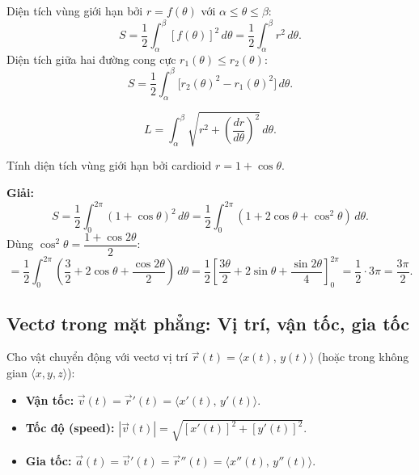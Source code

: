 \documentclass[12pt,a4paper]{article}
\begin{document}
\begin{congthuc}[title={Diện tích miền cực}]
  Diện tích vùng giới hạn bởi $r = f(\theta)$ với $\alpha \le \theta \le \beta$:
  \[
    S = \frac{1}{2}\int_\alpha^\beta [f(\theta)]^2\,d\theta = \frac{1}{2}\int_\alpha^\beta r^2\,d\theta.
  \]
  Diện tích giữa hai đường cong cực $r_1(\theta) \le r_2(\theta)$:
  \[
    S = \frac{1}{2}\int_\alpha^\beta \bigl[r_2(\theta)^2 - r_1(\theta)^2\bigr]\,d\theta.
  \]
\end{congthuc}

\begin{congthuc}[title={Độ dài cung trong tọa độ cực}]
  \[
    L = \int_\alpha^\beta \sqrt{r^2 + \left(\frac{dr}{d\theta}\right)^2}\,d\theta.
  \]
\end{congthuc}

\begin{vidu}
  Tính diện tích vùng giới hạn bởi cardioid $r = 1 + \cos\theta$.

  \medskip\textbf{Giải:}
  \[
    S = \frac{1}{2}\int_0^{2\pi} (1+\cos\theta)^2\,d\theta
    = \frac{1}{2}\int_0^{2\pi} (1 + 2\cos\theta + \cos^2\theta)\,d\theta.
  \]
  Dùng $\cos^2\theta = \dfrac{1+\cos 2\theta}{2}$:
  \[
    = \frac{1}{2}\int_0^{2\pi} \left(\frac{3}{2} + 2\cos\theta + \frac{\cos 2\theta}{2}\right)\,d\theta
    = \frac{1}{2}\left[\frac{3\theta}{2} + 2\sin\theta + \frac{\sin 2\theta}{4}\right]_0^{2\pi}
    = \frac{1}{2} \cdot 3\pi = \frac{3\pi}{2}.
  \]
\end{vidu}

\subsection{Vectơ trong mặt phẳng: Vị trí, vận tốc, gia tốc}

\begin{dinhnghia}[title={Vectơ vị trí, vận tốc, gia tốc}]
  Cho vật chuyển động với vectơ vị trí $\vec{r}(t) = \langle x(t),\, y(t) \rangle$ (hoặc trong không gian $\langle x, y, z \rangle$):
  \begin{itemize}
    \item \textbf{Vận tốc:} $\vec{v}(t) = \vec{r}'(t) = \langle x'(t),\, y'(t) \rangle$.
    \item \textbf{Tốc độ (speed):} $|\vec{v}(t)| = \sqrt{[x'(t)]^2 + [y'(t)]^2}$.
    \item \textbf{Gia tốc:} $\vec{a}(t) = \vec{v}'(t) = \vec{r}''(t) = \langle x''(t),\, y''(t) \rangle$.
  \end{itemize}
\end{dinhnghia}
\end{document}
